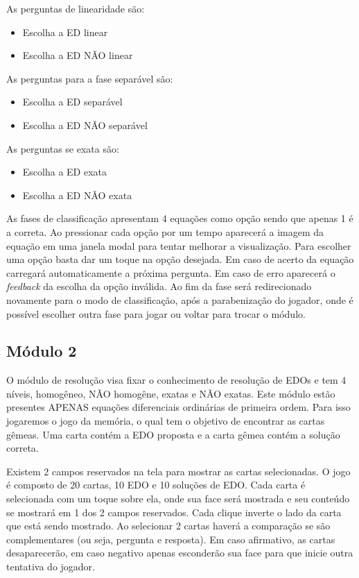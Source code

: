  
As perguntas de linearidade são:
\begin{itemize}
	\item{}Escolha a ED linear
	\item{}Escolha a ED NÃO linear
\end{itemize} 

As perguntas para a fase separável são:
\begin{itemize}
	\item{}Escolha a ED separável
	\item{}Escolha a ED NÃO separável
\end{itemize}

As perguntas se exata são:
\begin{itemize}
	\item{}Escolha a ED exata
	\item{}Escolha a ED NÃO exata
\end{itemize} 

As fases de classificação apresentam 4 equações como opção sendo que apenas 1 é a correta.
Ao pressionar cada opção por um tempo aparecerá a imagem da equação em uma janela modal para tentar melhorar a visualização.
Para escolher uma opção basta dar um toque na opção desejada.
Em caso de acerto da equação carregará automaticamente a próxima pergunta.
Em caso de erro aparecerá o \textit{feedback} da escolha da opção inválida.
Ao fim da fase será redirecionado novamente para o modo de classificação, após a parabenização do jogador, onde é possível escolher outra fase para jogar ou voltar para trocar o módulo.

\subsection[Módulo 2]{Módulo 2}

O módulo de resolução visa fixar o conhecimento de resolução de EDOs e tem 4 níveis, homogêneo, NÃO homogêne, exatas e NÃO exatas. Este módulo estão presentes APENAS equações diferenciais ordinárias de primeira ordem. Para isso jogaremos o jogo da memória, o qual tem o objetivo de encontrar as cartas gêmeas. Uma carta contém a EDO proposta e a carta gêmea contém a solução correta.

Existem 2 campos reservados na tela para mostrar as cartas selecionadas. O jogo é composto de 20 cartas, 10 EDO e 10 soluções de EDO. Cada carta é selecionada com um toque sobre ela, onde sua face será mostrada e seu conteúdo se mostrará em 1 dos 2 campos reservados. Cada clique inverte o lado da carta que está sendo mostrado. Ao selecionar 2 cartas haverá a comparação se são complementares (ou seja, pergunta e resposta). Em caso afirmativo, as cartas desaparecerão, em caso negativo apenas esconderão sua face para que inicie outra tentativa do jogador.

